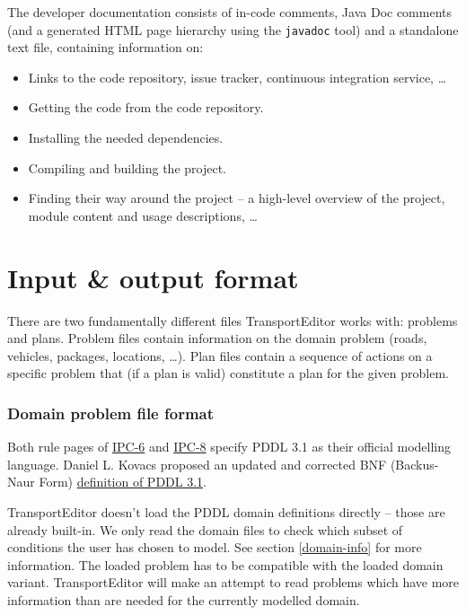 \documentclass[10pt,a4paper,oneside]{article}
\newcommand{\pname}{TransportEditor} %
\begin{document}
The developer documentation consists of in-code comments, Java Doc comments (and a generated HTML page hierarchy using the \verb+javadoc+ tool) and a standalone text file, containing information on:
\begin{itemize}
\item Links to the code repository, issue tracker, continuous integration service, \ldots
\item Getting the code from the code repository.
\item Installing the needed dependencies.
\item Compiling and building the project.
\item Finding their way around the project -- a high-level overview of the project, module content and usage descriptions, \ldots
\end{itemize}






\section{Input \& output format} \label{input-output}

There are two fundamentally different files \pname{} works with: problems and plans.
Problem files contain information on the domain problem (roads, vehicles, packages, locations, \ldots).
Plan files contain a sequence of actions on a specific problem that (if a plan is valid) constitute a plan
for the given problem.

\subsubsection{Domain problem file format}\label{problem-format}

Both rule pages of \href{http://icaps-conference.org/ipc2008/deterministic/CompetitionRules.html}{IPC-6}
and \href{https://helios.hud.ac.uk/scommv/IPC-14/rules.html}{IPC-8}
specify PDDL 3.1 as their official modelling language. Daniel L. Kovacs proposed an updated and corrected BNF (Backus-Naur Form)
\href{https://helios.hud.ac.uk/scommv/IPC-14/repository/kovacs-pddl-3.1-2011.pdf}{definition of PDDL 3.1}.

\pname{} doesn't load the PDDL domain definitions directly -- those are already built-in.
We only read the domain files to check which subset of conditions the user has chosen to model.
See section \ref{domain-info} for more information.
The loaded problem has to be compatible with the loaded domain variant.
\pname{} will make an attempt to read problems which have more information than are needed for the currently modelled domain.
\end{document}
